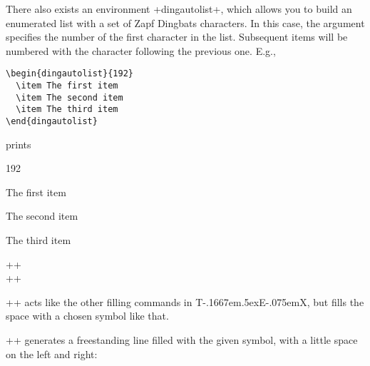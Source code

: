\documentclass[11pt]{ltxguide}[1995/11/28]
\makeatletter
\def\ptmTeX{T\kern-.1667em\lower.5ex\hbox{E}\kern-.075emX\@}
\let\TeX=\ptmTeX
\makeatother
\begin{document}
There also exists an environment +dingautolist+, which
allows you to build an enumerated list with a set of Zapf Dingbats
characters.  In this case, the argument specifies the number
of the first character in the list.  Subsequent items will be numbered
with the character following the previous one.  E.g.,
\begin{verbatim}
\begin{dingautolist}{192}
  \item The first item
  \item The second item
  \item The third item
\end{dingautolist}
\end{verbatim}
prints
\begin{dingautolist}{192}
  \item The first item
  \item The second item
  \item The third item
\end{dingautolist}

\begin{decl}
  +\dingfill+ \\
  +\dingline+ 
\end{decl}

+\dingfill+ acts like the other filling commands in \TeX, but
fills the space with a chosen symbol  like that.

+\dingline+ generates a freestanding line filled with the given symbol,
with a little space on the left and right:
\end{document}
